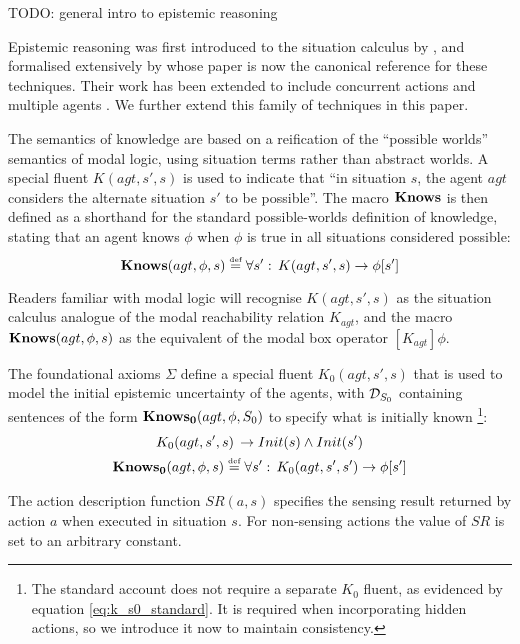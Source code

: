TODO: general intro to epistemic reasoning \citet{halpern90knowledge_distrib,fagin95}

Epistemic reasoning was first introduced to the situation calculus
by \citet{moore80know_act}, and formalised extensively by \citet{scherl03sc_knowledge}
whose paper is now the canonical reference for these techniques. Their
work has been extended to include concurrent actions \citet{scherl03conc_knowledge}
and multiple agents \citet{shapiro98specifying_ma_systems}. We further
extend this family of techniques in this paper.

The semantics of knowledge are based on a reification of the {}``possible
worlds'' semantics of modal logic, using situation terms rather than
abstract worlds. A special fluent $K(agt,s',s)$ is used to indicate
that {}``in situation $s$, the agent $agt$ considers the alternate
situation $s'$ to be possible''. The macro $\mathbf{Knows}$ is then defined
as a shorthand for the standard possible-worlds definition of knowledge,
stating that an agent knows $\phi$ when $\phi$ is true in all situations
considered possible: \begin{equation}
\mathbf{Knows}(agt,\phi,s)\stackrel{\mbox{\tiny def}}{=}\forall s':\, K(agt,s',s)\rightarrow\phi[s']\label{eqn:Background:knows_def}\end{equation}


Readers familiar with modal logic will recognise $K(agt,s',s)$ as
the situation calculus analogue of the modal reachability relation
$K_{agt}$, and the macro $\mathbf{Knows}(agt,\phi,s)$ as the equivalent
of the modal box operator $[K_{agt}]\phi$.

The foundational axioms $\Sigma$ define a special fluent $K_{0}(agt,s',s)$
that is used to model the initial epistemic uncertainty of the agents,
with $\mathcal{D}_{S_{0}}$ containing sentences of the form $\mathbf{Knows_{0}}(agt,\phi,S_{0})$
to specify what is initially known%
\footnote{The standard account does not require a separate $K_{0}$ fluent,
as evidenced by equation \eqref{eq:k_s0_standard}. It is required
when incorporating hidden actions, so we introduce it now to maintain
consistency. %
}:\begin{gather*}
K_{0}(agt,s',s)\,\rightarrow Init(s)\wedge Init(s')\\
\mathbf{Knows_{0}}(agt,\phi,s)\stackrel{\mbox{\tiny def}}{=}\forall s':\, K_{0}(agt,s',s')\rightarrow\phi[s']\end{gather*}


The action description function $SR(a,s)$ specifies the sensing result
returned by action $a$ when executed in situation $s$. For non-sensing
actions the value of $SR$ is set to an arbitrary constant.

